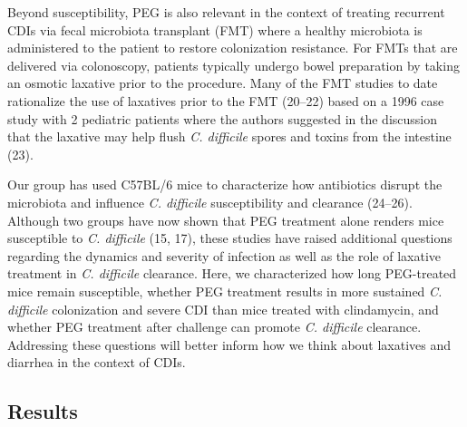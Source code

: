 \documentclass[
  11pt,
]{article}
\begin{document}
Beyond susceptibility, PEG is also relevant in the context of treating
recurrent CDIs via fecal microbiota transplant (FMT) where a healthy
microbiota is administered to the patient to restore colonization
resistance. For FMTs that are delivered via colonoscopy, patients
typically undergo bowel preparation by taking an osmotic laxative prior
to the procedure. Many of the FMT studies to date rationalize the use of
laxatives prior to the FMT (20--22) based on a 1996 case study with 2
pediatric patients where the authors suggested in the discussion that
the laxative may help flush \emph{C. difficile} spores and toxins from
the intestine (23).

Our group has used C57BL/6 mice to characterize how antibiotics disrupt
the microbiota and influence \emph{C. difficile} susceptibility and
clearance (24--26). Although two groups have now shown that PEG
treatment alone renders mice susceptible to \emph{C. difficile} (15,
17), these studies have raised additional questions regarding the
dynamics and severity of infection as well as the role of laxative
treatment in \emph{C. difficile} clearance. Here, we characterized how
long PEG-treated mice remain susceptible, whether PEG treatment results
in more sustained \emph{C. difficile} colonization and severe CDI than
mice treated with clindamycin, and whether PEG treatment after challenge
can promote \emph{C. difficile} clearance. Addressing these questions
will better inform how we think about laxatives and diarrhea in the
context of CDIs.

\hypertarget{results}{%
\subsection{Results}\label{results}}
\end{document}
